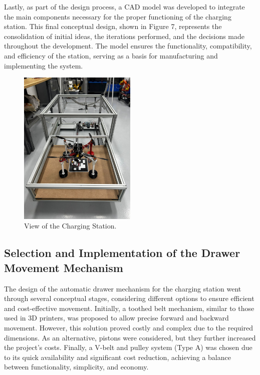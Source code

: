 Lastly, as part of the design process, a CAD model was developed to integrate the main components necessary for the proper functioning of the charging station. This final conceptual design, shown in Figure 7, represents the consolidation of initial ideas, the iterations performed, and the decisions made throughout the development. The model ensures the functionality, compatibility, and efficiency of the station, serving as a basis for manufacturing and implementing the system.

        \begin{figure}[H]
            \centering
            \includegraphics[width=0.5\textwidth]{pictures/ESTACION_FINAL.jpg}
            \caption{View of the Charging Station.}
            \label{fig:etiqueta}
        \end{figure}

\subsection{Selection and Implementation of the Drawer Movement Mechanism}

The design of the automatic drawer mechanism for the charging station went through several conceptual stages, considering different options to ensure efficient and cost-effective movement. Initially, a toothed belt mechanism, similar to those used in 3D printers, was proposed to allow precise forward and backward movement. However, this solution proved costly and complex due to the required dimensions. As an alternative, pistons were considered, but they further increased the project's costs. Finally, a V-belt and pulley system (Type A) was chosen due to its quick availability and significant cost reduction, achieving a balance between functionality, simplicity, and economy.


